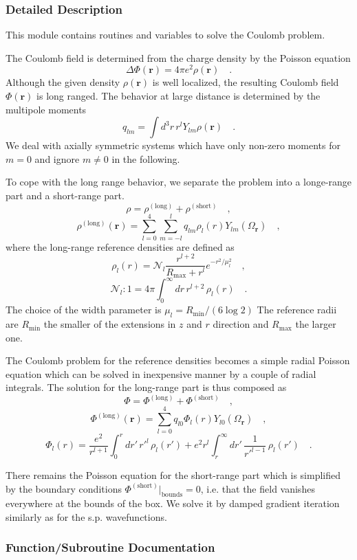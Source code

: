 \subsubsection{Detailed Description}
This module contains routines and variables to solve the Coulomb problem. 

The Coulomb field is determined from the charge density by the Poisson equation \[\Delta\Phi(\mathbf{r}) = 4\pi e^2\rho(\mathbf{r}) \quad.\] Although the given density $ \rho(\mathbf{r}) $ is well localized, the resulting Coulomb field $\Phi(\mathbf{r})$ is long ranged. The behavior at large distance is determined by the multipole moments \[ q_{lm}=\int d^3r\,r^lY_{lm}\rho(\mathbf{r})\quad.\] We deal with axially symmetric systems which have only non-\/zero moments for $m=0$ and ignore $m\neq 0$ in the following.

To cope with the long range behavior, we separate the problem into a longe-\/range part and a short-\/range part. \[\rho=\rho^\mathrm{(long)}+\rho^\mathrm{(short)}\quad,\] \[ \rho^\mathrm{(long)}(\mathbf{r})=\sum_{l=0}^4\sum_{m=-l}^lq_{lm} \rho_l(r)Y_{lm}(\Omega_\mathbf{r})\quad,\] where the long-\/range reference densities are defined as \[\rho_l(r)=\mathcal{N}_l\frac{r^{l+2}}{R_\mathrm{max}+r^l} e^{-r^2/\mu_l^2}\quad,\] \[\mathcal{N}_l: 1=4\pi\int_0^\infty dr\,r^{l+2}\,\rho_l(r)\quad.\] The choice of the width parameter is $\mu_l=R_\mathrm{min}/(6\log2)$ The reference radii are $R_\mathrm{min}$ the smaller of the extensions in $z$ and $r$ direction and $R_\mathrm{max}$ the larger one.

The Coulomb problem for the reference densities becomes a simple radial Poisson equation which can be solved in inexpensive manner by a couple of radial integrals. The solution for the long-\/range part is thus composed as \[\Phi=\Phi^\mathrm{(long)}+\Phi^\mathrm{(short)}\quad,\] \[\Phi^\mathrm{(long)}(\mathbf{r})=\sum_{l=0}^4q_{l0} \Phi_l(r)Y_{l0}(\Omega_\mathbf{r})\quad,\] \[\Phi_l(r)=\frac{e^2}{r^{l+1}}\int_0^r dr'\,{r'}^l\,\rho_l(r')+ e^2{r}^l\int_r^\infty dr'\,\frac{1}{{r'}^{l-1}}\,\rho_l(r')\quad.\]

There remains the Poisson equation for the short-\/range part which is simplified by the boundary conditions $\Phi^\mathrm{(short)} \big|_\mathrm{bounds}=0$, i.\+e. that the field vanishes everywhere at the bounds of the box. We solve it by damped gradient iteration similarly as for the s.\+p. wavefunctions. 

\subsubsection{Function/\+Subroutine Documentation}
